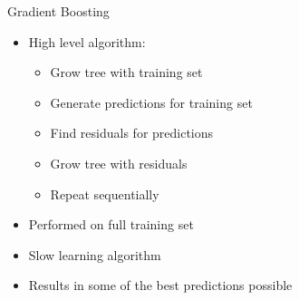 \documentclass{beamer}
\begin{document}
	\begin{frame}{Gradient Boosting}
		\begin{itemize}
			\item High level algorithm:
			\begin{itemize}
				\item Grow tree with training set
				\item Generate predictions for training set
				\item Find residuals for predictions
				\item Grow tree with residuals
				\item Repeat sequentially
			\end{itemize}
			\item Performed on full training set
			\item Slow learning algorithm
			\item Results in some of the best predictions possible
		\end{itemize}
	\end{frame}
\end{document}
